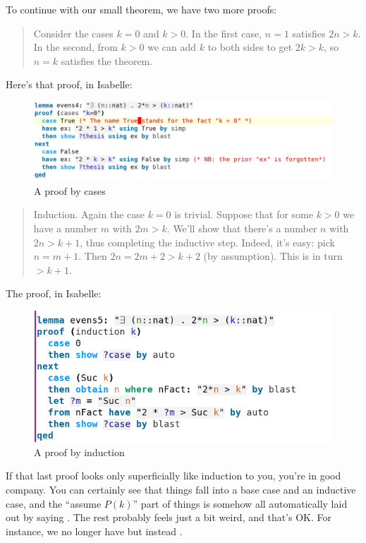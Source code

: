 To continue with our small theorem, we have two more proofs: 

\begin{quotation}
Consider the cases $k = 0$ and $k > 0$. In the first case, $n = 1$ satisfies $2n > k$. In the second, from $k > 0$ we can add $k$ to both sides to get $2k > k$, so $n = k$ satisfies the theorem.
\end{quotation}

Here's that proof, in Isabelle:
\begin{figure}[h]
    \includegraphics[width=1\linewidth]{TEXT/C01/Images/proof2.png}
    \caption{A proof by cases}
\end{figure}

\begin{quotation}    
Induction. Again the case $k = 0$ is trivial. Suppose that for some $k > 0$ we have a number $m$ with $2m > k$. We'll show that there's a number $n$ with $2n > k+1$, thus completing the inductive step. Indeed, it's easy: pick $n = m + 1$. Then $2n = 2m + 2  > k + 2$ (by assumption). This is in turn $> k + 1.$ 
\end{quotation}

The proof, in Isabelle:

\begin{figure}[H]
    \centering
    \includegraphics[width=0.75\linewidth]{TEXT/C01/Images/proof3.png}
    \caption{A proof by induction}
\end{figure}

If that last proof looks only superficially like induction to you, you're in good company. You can certainly see that things fall into a base case and an inductive case, and the ``assume $P(k)$'' part of things is somehow all automatically laid out by saying . The rest probably feels just a bit weird, and that's OK. For instance, we no longer have  but instead . 


